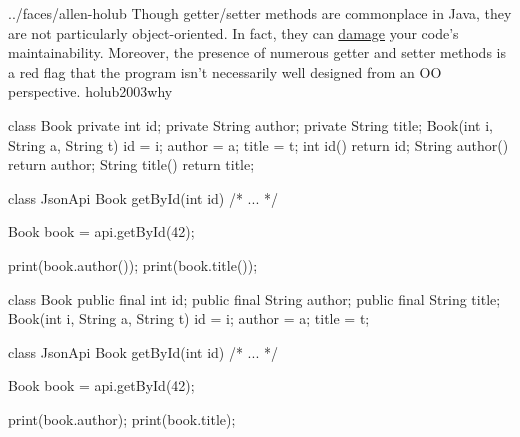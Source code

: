 \documentclass{article}
\begin{document}
\lnQuote
  {../faces/allen-holub}
  {Though getter/setter methods are commonplace in Java, they are not particularly object-oriented. In fact, they can \ul{damage} your code's maintainability. Moreover, the presence of numerous getter and setter methods is a red flag that the program isn't necessarily well designed from an OO perspective.}
  {holub2003why}

\begin{pptWide}{2}
{\small\begin{ffcode}
class Book {
  private int id;
  private String author;
  private String title;
  Book(int i, String a, String t)
    { id = i; author = a; title = t; }
  int id() { return id; }
  String author() { return author; }
  String title() { return title; }
}
\end{ffcode}
}
\par\columnbreak\par
{\small\begin{ffcode}
class JsonApi {
  Book getById(int id) { /* ... */ }
}

Book book = api.getById(42);

print(book.author());
print(book.title());
\end{ffcode}
}
\end{pptWide}
\par
\plush{}

\begin{pptWide}{2}
{\small\begin{ffcode}
class Book {
  public final int id;
  public final String author;
  public final String title;
  Book(int i, String a, String t)
    { id = i; author = a; title = t; }
}
\end{ffcode}
}
\par\columnbreak\par
{\small\begin{ffcode}
class JsonApi {
  Book getById(int id) { /* ... */ }
}

Book book = api.getById(42);

print(book.author);
print(book.title);
\end{ffcode}
}
\end{pptWide}
\par
\plush{}
\end{document}
